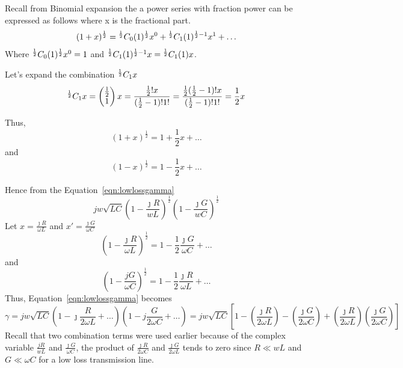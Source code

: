 Recall from Binomial expansion the a power series with fraction power can be expressed as follows where x is the fractional part. 
\begin{dmath*}
(1 + x)^{\frac{1}{2}} = \Comb{\frac{1}{2}}{0}(1)^{\frac{1}{2}}x^0 + \Comb{\frac{1}{2}}{1}(1)^{{\frac{1}{2}} - 1}x^1 + \ldots
\end{dmath*}
Where ${}^{\frac{1}{2}}C_{0}(1)^{\frac{1}{2}}x^0 = 1$ and ${}^{\frac{1}{2}}C_{1}(1)^{\frac{1}{2} - 1}x = {}^{\frac{1}{2}}C_{1}(1)x$.

Let's expand the combination ${}^{\frac{1}{2}}C_{1} x$
\begin{dmath*}
\Comb{\frac{1}{2}}{1} x = \begin{pmatrix}\frac{1}{2}\\1 \end{pmatrix}x = \frac{\frac{1}{2}! x}{(\frac{1}{2} - 1)!1!} = \frac{\frac{1}{2}(\frac{1}{2} - 1)! x}{(\frac{1}{2} - 1)!1!} = \frac{1}{2}x
\end{dmath*}

Thus,
\[(1 + x)^{\frac{1}{2}} = 1 + \frac{1}{2}x + \ldots\]
and
\[(1 - x)^{\frac{1}{2}} = 1 - \frac{1}{2}x + \ldots\]

Hence from the Equation~\ref{eqn:lowlossgamma}
\[jw\sqrt{LC}\left(1 - \frac{\jmath R}{wL}\right)^{\frac{1}{2}}\left(1 - \frac{\jmath G}{wC}\right)^{\frac{1}{2}}\]
Let $x = \frac{\jmath R}{\omega L}$ and $x' = \frac{\jmath G}{\omega C}$
\begin{dmath*}
(1 - \frac{\jmath R}{\omega L})^{\frac{1}{2}} = 1 - \frac{1}{2}\frac{\jmath G}{\omega C} + \ldots
\end{dmath*}
and
\begin{dmath*}
(1 - \frac{jG}{\omega C})^{\frac{1}{2}} = 1 - \frac{1}{2}\frac{\jmath R}{\omega L} + \ldots 
\end{dmath*}
Thus, Equation~\ref{eqn:lowlossgamma} becomes
\begin{dmath*}
\gamma = jw\sqrt{LC}\left(1 - \jmath \frac{R}{2\omega L} + \ldots\right)\left(1 - j\frac{G}{2\omega C} + \ldots\right) = jw\sqrt{LC} \left[1- \left(\frac{\jmath R}{2\omega L}\right) - \left(\frac{\jmath G}{2\omega C}\right) + \left(\frac{\jmath R}{2\omega L}\right)\left(\frac{\jmath G}{2\omega C}\right)\right]
\end{dmath*}
Recall that two combination terms were used earlier because of the complex variable $\frac{jR}{wL}$ and $\frac{\jmath G}{\omega C}$, the product of $\frac{\jmath R}{2\omega C}$ and $\frac{\jmath G}{2\omega L}$ tends to zero since $R \ll wL$ and $G \ll \omega C$ for a low loss transmission line.

